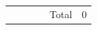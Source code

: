 \documentclass[11pt]{article}
\begin{document}
\begin{table}
\begin{tabular}{lllllrr}
                                                                                                                                       &                                                                                                                                                                           &                                                                                                            & \multicolumn{1}{l|}{}                                                                                      & \multicolumn{1}{l|}{Total}                                                                                                                                                                   & \multicolumn{2}{r|}{0}                                   \\ \cline{5-7} 
        \end{tabular}
    \end{table}
    
\end{document}
